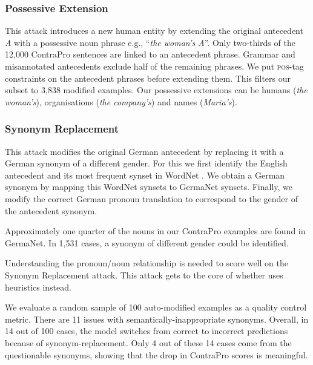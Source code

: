 \subsubsection{Possessive Extension}
This attack introduces a new human entity by extending the original antecedent \emph{A} with a possessive noun phrase e.g., ``\textit{the woman's A}''. 
%
Only two-thirds of the 12,000 ContraPro sentences are linked to an antecedent phrase. Grammar and misannotated antecedents exclude half of the remaining phrases.
We put \textsc{pos}-tag constraints on the antecedent phrases before extending them. 
%
This filters our subset to 3,838 modified examples. 
%
Our possessive extensions can be humans (\textit{the woman's}), organisations (\textit{the company's}) and names (\textit{Maria's}).

\subsubsection{Synonym Replacement}
This attack modifies the original German antecedent by replacing it with a German synonym of a different gender. 
%
For this we first identify the English antecedent and its most frequent synset in WordNet \citep{miller1995wordnet}.
%
We obtain a German synonym by mapping this WordNet synsets to GermaNet \citep{hamp-feldweg-1997-germanet} synsets.
%
Finally, we modify the correct German pronoun translation to correspond to the gender of the antecedent synonym.

Approximately one quarter of the nouns in our ContraPro examples are found in GermaNet.  
In 1,531 cases, a synonym of different gender could be identified. 

Understanding the pronoun/noun relationship is needed to score well on the Synonym Replacement attack. This attack gets to the core of whether \nmt{} uses \coref{} heuristics instead.

We evaluate a random sample of 100 auto-modified examples as a quality control metric.  
%
There are 11 issues with semantically-inappropriate synonyms. 
%
Overall, in 14 out of 100 cases, the model switches from correct to incorrect predictions because of synonym-replacement.
%
Only 4 out of these 14 cases come from the questionable synonyms, showing that the drop in ContraPro scores is meaningful.

